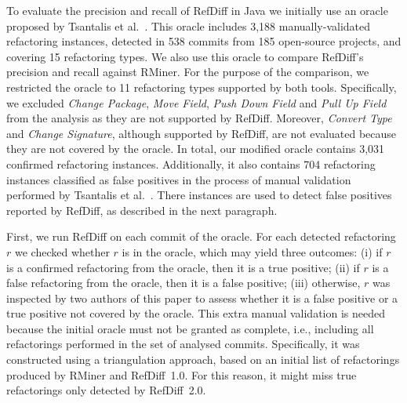 To evaluate the precision and recall of RefDiff in Java we initially use an oracle proposed by Tsantalis et al.~\cite{tsantalis2018rminer}.
This oracle includes 3,188 manually-validated refactoring instances, detected in 538 commits from 185 open-source projects, and covering 15 refactoring types.
We also use this oracle to compare RefDiff's precision and recall against RMiner.
For the purpose of the comparison, we restricted the oracle to 11 refactoring types supported by both tools.
Specifically, we excluded \emph{Change Package}, \emph{Move Field}, \emph{Push Down Field} and \emph{Pull Up Field} from the analysis as they are not supported by RefDiff.
Moreover, \emph{Convert Type} and \emph{Change Signature}, although supported by RefDiff, are not evaluated because they are not covered by the oracle.
In total, our modified oracle contains 3,031 confirmed refactoring instances.
Additionally, it also contains 704 refactoring instances classified as false positives in the process of manual validation performed by Tsantalis et al.~\cite{tsantalis2018rminer}.
There instances are used to detect false positives reported by RefDiff, as described in the next paragraph.

First, we run RefDiff on each commit of the oracle. For each detected refactoring $r$ we checked whether $r$ is in the oracle, which may yield three outcomes: (i) if $r$ is a confirmed refactoring from the oracle, then it is a true positive; (ii) if $r$ is a false refactoring from the oracle, then it is a false positive; (iii) otherwise, $r$ was inspected by two authors of this paper to assess whether it is a false positive or a true positive not covered by the oracle.
This extra manual validation is needed because the initial oracle must not be granted as complete, i.e., including all refactorings performed in the set of analysed commits.
Specifically, it was constructed using a triangulation approach, based on an initial list of refactorings produced by RMiner and RefDiff~1.0. For this reason, it might miss true refactorings only detected by RefDiff~2.0. %



